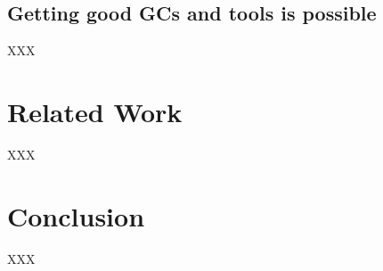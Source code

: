 \documentclass{llncs}
\begin{document}
\subsection{Getting good GCs and tools is possible}
XXX 

\section{Related Work}
XXX 

\section{Conclusion}
XXX 


\end{document}
